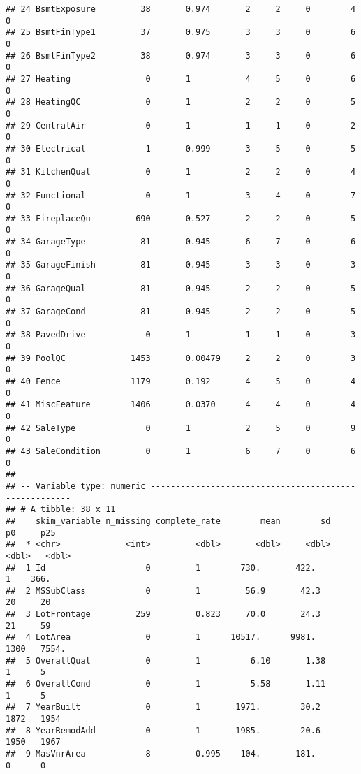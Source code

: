 \documentclass[
]{article}
\begin{document}
\begin{verbatim}
## 24 BsmtExposure         38       0.974       2     2     0        4          0
## 25 BsmtFinType1         37       0.975       3     3     0        6          0
## 26 BsmtFinType2         38       0.974       3     3     0        6          0
## 27 Heating               0       1           4     5     0        6          0
## 28 HeatingQC             0       1           2     2     0        5          0
## 29 CentralAir            0       1           1     1     0        2          0
## 30 Electrical            1       0.999       3     5     0        5          0
## 31 KitchenQual           0       1           2     2     0        4          0
## 32 Functional            0       1           3     4     0        7          0
## 33 FireplaceQu         690       0.527       2     2     0        5          0
## 34 GarageType           81       0.945       6     7     0        6          0
## 35 GarageFinish         81       0.945       3     3     0        3          0
## 36 GarageQual           81       0.945       2     2     0        5          0
## 37 GarageCond           81       0.945       2     2     0        5          0
## 38 PavedDrive            0       1           1     1     0        3          0
## 39 PoolQC             1453       0.00479     2     2     0        3          0
## 40 Fence              1179       0.192       4     5     0        4          0
## 41 MiscFeature        1406       0.0370      4     4     0        4          0
## 42 SaleType              0       1           2     5     0        9          0
## 43 SaleCondition         0       1           6     7     0        6          0
## 
## -- Variable type: numeric ------------------------------------------------------
## # A tibble: 38 x 11
##    skim_variable n_missing complete_rate        mean        sd    p0     p25
##  * <chr>             <int>         <dbl>       <dbl>     <dbl> <dbl>   <dbl>
##  1 Id                    0         1        730.       422.        1    366.
##  2 MSSubClass            0         1         56.9       42.3      20     20 
##  3 LotFrontage         259         0.823     70.0       24.3      21     59 
##  4 LotArea               0         1      10517.      9981.     1300   7554.
##  5 OverallQual           0         1          6.10       1.38      1      5 
##  6 OverallCond           0         1          5.58       1.11      1      5 
##  7 YearBuilt             0         1       1971.        30.2    1872   1954 
##  8 YearRemodAdd          0         1       1985.        20.6    1950   1967 
##  9 MasVnrArea            8         0.995    104.       181.        0      0 

\end{verbatim}
\end{document}
